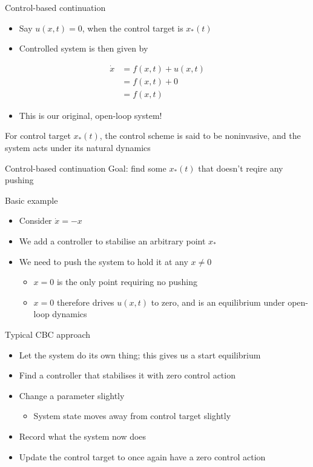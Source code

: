 \documentclass[presentation]{beamer}
\begin{document}
\begin{frame}[label={sec:org7bb4b32}]{Control-based continuation}
\begin{itemize}
\item Say \(u(x,t) = 0\), when the control target is \(x_*(t)\)
\item Controlled system is then given by
\end{itemize}
\begin{align}
\dot{x} &= f(x,t) + u(x,t) \nonumber \\
&= f(x,t) + 0 \nonumber \\
&= f(x,t)\nonumber
\end{align}

\begin{itemize}
\item This is our original, open-loop system!
\end{itemize}

For control target \(x_*(t)\), the control scheme is said to be noninvasive, and the system acts under its natural dynamics
\end{frame}

\begin{frame}[label={sec:orgd37cdf7}]{Control-based continuation}
Goal: find some \(x_*(t)\) that doesn't reqire any pushing
\end{frame}
\begin{frame}[label={sec:org797baa0}]{Basic example}
\begin{itemize}
\item Consider \(\dot{x} = -x\)
\item We add a controller to stabilise an arbitrary point \(x_*\)
\item We need to push the system to hold it at any \(x\neq0\)
\begin{itemize}
\item \(x=0\) is the only point requiring no pushing
\item \(x=0\) therefore drives \(u(x,t)\) to zero, and is an equilibrium under open-loop dynamics
\end{itemize}
\end{itemize}
\end{frame}

\begin{frame}[label={sec:org5ff61cd}]{Typical CBC approach}
\begin{itemize}[<+->]
\item Let the system do its own thing; this gives us a start equilibrium
\item Find a controller that stabilises it with zero control action
\item Change a parameter slightly
\begin{itemize}
\item System state moves away from control target slightly
\end{itemize}
\item Record what the system now does
\item Update the control target to once again have a zero control action
\end{itemize}
\end{frame}
\end{document}
